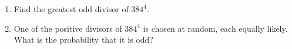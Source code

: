 \begin{enumerate}
\item[(a)] Find the greatest odd divisor of $384^4$.
\item[(b)] One of the positive divisors of $384^4$ is chosen at random, each equally likely. What is the probability that it is odd?
\end{enumerate}
